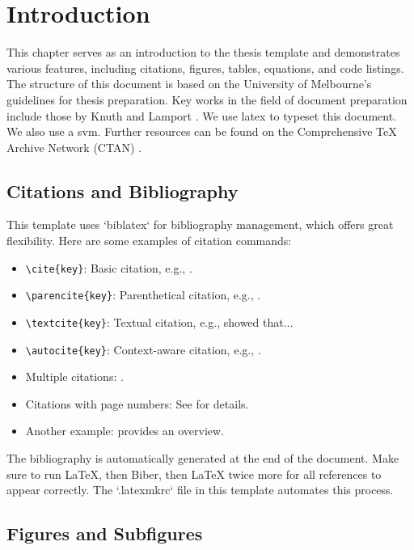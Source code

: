 \chapter{Introduction}
\label{ch:introduction}

This chapter serves as an introduction to the thesis template and demonstrates various features, including citations, figures, tables, equations, and code listings.
The structure of this document is based on the University of Melbourne's guidelines for thesis preparation.
Key works in the field of document preparation include those by Knuth \cite{Knuth1984} and Lamport \cite{Lamport1986}.
We use \gls{latex} to typeset this document. We also use a \gls{svm}.
Further resources can be found on the Comprehensive TeX Archive Network (CTAN) \autocite{CTAN}.

\section{Citations and Bibliography}
\label{sec:citations}

This template uses `biblatex` for bibliography management, which offers great flexibility.
Here are some examples of citation commands:
\begin{itemize}
    \item \verb|\cite{key}|: Basic citation, e.g., \cite{Reference1}.
    \item \verb|\parencite{key}|: Parenthetical citation, e.g., \parencite{Reference2}.
    \item \verb|\textcite{key}|: Textual citation, e.g., \textcite{Reference3} showed that...
    \item \verb|\autocite{key}|: Context-aware citation, e.g., \autocite{Hao2023}.
    \item Multiple citations: \cite{Reference1, Reference2}.
    \item Citations with page numbers: See \cite[p.~15]{Knuth1984} for details.
    \item Another example: \textcite[see Chapter~3]{Lamport1986} provides an overview.
\end{itemize}
The bibliography is automatically generated at the end of the document. Make sure to run LaTeX, then Biber, then LaTeX twice more for all references to appear correctly. The `.latexmkrc` file in this template automates this process.

\section{Figures and Subfigures}
\label{sec:figures}

